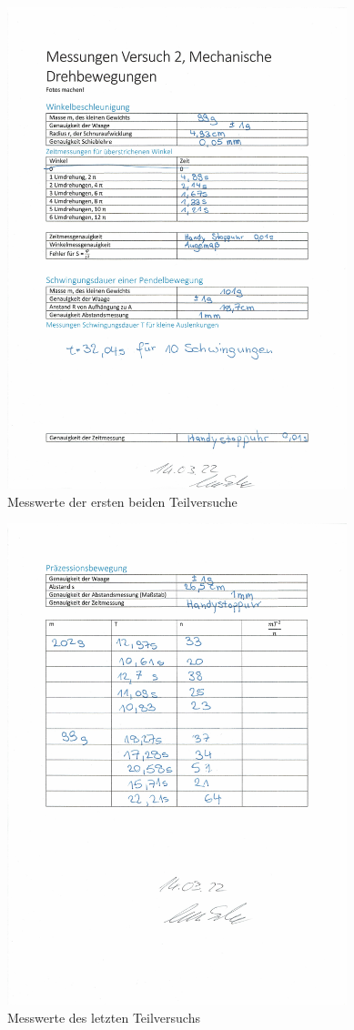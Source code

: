 \documentclass{article}
\begin{document}
	\begin{figure}[!h]\label{fig:Messwerte1}
		\centering
		\includegraphics[height=14cm]{messwerte1.jpg}
		\caption{Messwerte der ersten beiden Teilversuche}
	\end{figure}

	\begin{figure}[!h]\label{fig:Messwerte2}
		\centering
		\includegraphics[height=14cm]{messwerte2.jpg}
		\caption{Messwerte des letzten Teilversuchs}
	\end{figure}
\end{document}
